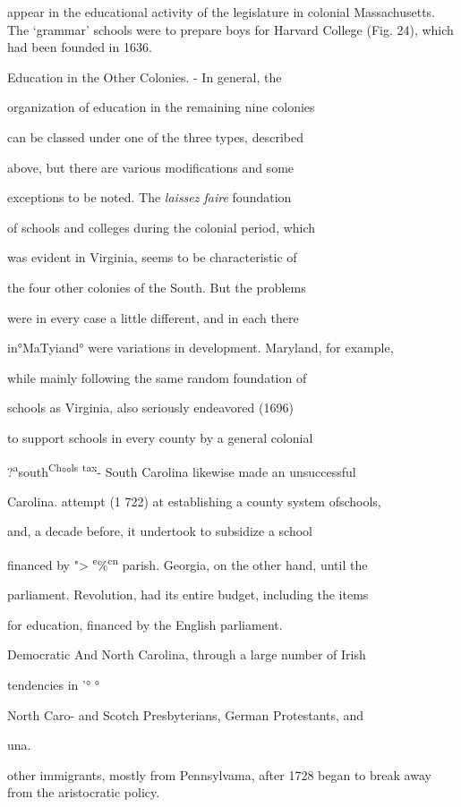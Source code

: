 \documentclass[]{book}
\begin{document}
appear in the educational activity of the legislature in colonial Massachusetts. The `grammar' schools were to prepare boys for Harvard College (Fig. 24), which had been founded in 1636.

Education in the Other Colonies. - In general, the

organization of education in the remaining nine colonies

can be classed under one of the three types, described

above, but there are various modifications and some

exceptions to be noted. The \emph{laissez faire} foundation

of schools and colleges during the colonial period, which

was evident in Virginia, seems to be characteristic of

the four other colonies of the South. But the problems

were in every case a little different, and in each there

in°MaTyiand° were variations in development. Maryland, for example,

while mainly following the same random foundation of

schools as Virginia, also seriously endeavored (1696)

to support schools in every county by a general colonial

?\textsuperscript{a}south\textsuperscript{Ch}°°\textsuperscript{ls} \textsuperscript{tax}- South Carolina likewise made an unsuccessful

Carolina. attempt (1 722) at establishing a county system ofschools,

and, a decade before, it undertook to subsidize a school

financed by "\textgreater{} \textsuperscript{e}\%\textsuperscript{cn} parish. Georgia, on the other hand, until the

parliament. Revolution, had its entire budget, including the items

for education, financed by the English parliament.

Democratic And North Carolina, through a large number of Irish

tendencies in '° °

North Caro- and Scotch Presbyterians, German Protestants, and

una.

other immigrants, mostly from Pennsylvama, after 1728 began to break away from the aristocratic policy.
\end{document}

